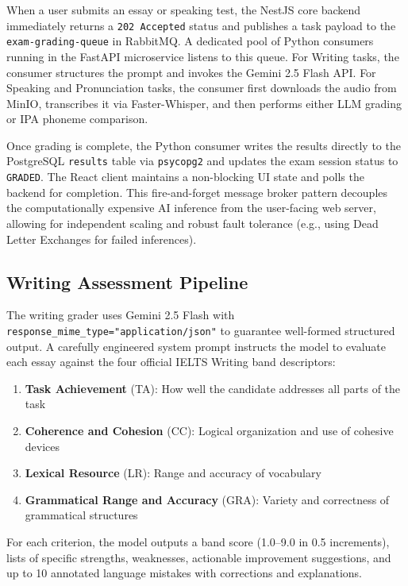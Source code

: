 \documentclass{IEEEtran}
\begin{document}
When a user submits an essay or speaking test, the NestJS core backend immediately returns a \texttt{202 Accepted} status and publishes a task payload to the \texttt{exam-grading-queue} in RabbitMQ. A dedicated pool of Python consumers running in the FastAPI microservice listens to this queue. For Writing tasks, the consumer structures the prompt and invokes the Gemini 2.5 Flash API. For Speaking and Pronunciation tasks, the consumer first downloads the audio from MinIO, transcribes it via Faster-Whisper, and then performs either LLM grading or IPA phoneme comparison. 

Once grading is complete, the Python consumer writes the results directly to the PostgreSQL \texttt{results} table via \texttt{psycopg2} and updates the exam session status to \texttt{GRADED}. The React client maintains a non-blocking UI state and polls the backend for completion. This fire-and-forget message broker pattern decouples the computationally expensive AI inference from the user-facing web server, allowing for independent scaling and robust fault tolerance (e.g., using Dead Letter Exchanges for failed inferences).

\subsection{Writing Assessment Pipeline}

The writing grader uses Gemini 2.5 Flash with \texttt{response\_mime\_type="application/json"} to guarantee well-formed structured output. A carefully engineered system prompt instructs the model to evaluate each essay against the four official IELTS Writing band descriptors:

\begin{enumerate}
\item \textbf{Task Achievement} (TA): How well the candidate addresses all parts of the task
\item \textbf{Coherence and Cohesion} (CC): Logical organization and use of cohesive devices
\item \textbf{Lexical Resource} (LR): Range and accuracy of vocabulary
\item \textbf{Grammatical Range and Accuracy} (GRA): Variety and correctness of grammatical structures
\end{enumerate}

For each criterion, the model outputs a band score (1.0--9.0 in 0.5 increments), lists of specific strengths, weaknesses, actionable improvement suggestions, and up to 10 annotated language mistakes with corrections and explanations.
\end{document}
